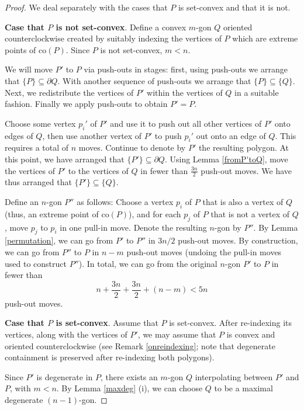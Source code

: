\documentclass[11pt]{amsart}
\theoremstyle{remark}
\numberwithin{equation}{section}
\newcommand{\co}{\mathrm{co}}
\begin{document}
\begin{proof}
We deal separately with the cases that $P$ is set-convex and that it is not.

\textbf{Case that $P$ is not set-convex}. Define a convex $m$-gon $Q$ oriented counterclockwise created by suitably indexing the  vertices of $P$ which are extreme points of  $\co(P)$. 
Since $P$ is not set-convex, $m<n$.

We will move $P'$ to $P$ via push-outs in stages: first, using push-outs we arrange that $\{P\}\subseteq \partial Q$. With another sequence of push-outs we arrange that $\{P\}\subseteq \{Q\}$. Next,  we redistribute the vertices of $P'$ within the vertices of $Q$ in a suitable fashion. Finally we apply push-outs to obtain $P'=P$.

Choose some vertex $p_i'$ of $P'$ and use it to push out all other vertices of $P'$ onto edges of $Q$, then use another vertex of $P'$ to push $p_i'$ out onto an edge of $Q$. 
This requires a total of $n$ moves. Continue to denote by $P'$ the resulting polygon. At this point, we have arranged that $\{P'\}\subseteq \partial Q$.
Using Lemma \ref{fromP'toQ},   move the vertices of  $P'$ to the vertices of $Q$ in fewer than $ \frac{3n}{2}$ push-out moves. We have thus arranged that $\{P'\}\subseteq \{Q\}$.

 Define an $n$-gon $P''$ as follows: 
Choose a vertex $p_i$ of $P$ that is also a vertex of $Q$ (thus, an extreme point of $\co(P)$),  and for each 
$p_j$ of $P$ that is not a vertex of $Q$, move $p_j$ to $p_i$ in one pull-in move. Denote the resulting $n$-gon by $P''$.  
By Lemma \ref{permutation}, we can go from $P'$ to $P''$ in $3n/2$ push-out moves. 
By construction, we can go from $P''$ to $P$ in $n-m$ push-out moves (undoing the pull-in moves used to construct $P''$). In total,
we can go from the original $n$-gon $P'$ to $P$
in fewer than
\[
n+ \frac{3n}{2}+\frac{3n}{2}+(n-m)< 5n
\] 
push-out moves.

 

\textbf{Case that $P$ is set-convex}. Assume that $P$ is set-convex. After re-indexing its vertices, along with the vertices of $P'$, we may assume that $P$ is convex and oriented counterclockwise (see Remark \ref{onreindexing}; note that degenerate containment is preserved after re-indexing both polygons). 

Since $P'$ is degenerate in $P$, there exists an $m$-gon $Q$ interpolating between $P'$ and $P$, with $m<n$. By Lemma \ref{maxdeg} (i), we can choose $Q$ to be a  maximal degenerate  $(n-1)$-gon. 


\end{proof}
\end{document}
